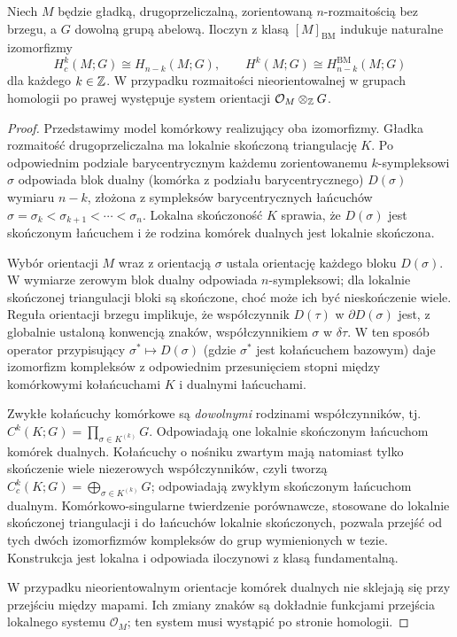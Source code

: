 \begin{twierdzenie}
\label{thm:noncompact-PD-v11}
Niech $M$ będzie gładką, drugoprzeliczalną,
zorientowaną $n$-rozmaitością bez brzegu,
a $G$ dowolną grupą abelową. Iloczyn z klasą
$[M]_{\mathrm{BM}}$ indukuje naturalne izomorfizmy
\[
H_c^k(M;G)\cong H_{n-k}(M;G),\qquad
H^k(M;G)\cong H_{n-k}^{\mathrm{BM}}(M;G)
\]
dla każdego $k\in\mathbb{Z}$. W przypadku rozmaitości
nieorientowalnej w grupach homologii po prawej
występuje system orientacji $\mathcal O_M\otimes_{\mathbb{Z}}G$.
\end{twierdzenie}
\begin{proof}
Przedstawimy model komórkowy realizujący oba izomorfizmy.
Gładka rozmaitość drugoprzeliczalna ma lokalnie skończoną
triangulację $K$. Po odpowiednim podziale barycentrycznym
każdemu zorientowanemu $k$-sympleksowi $\sigma$ odpowiada
blok dualny (komórka z podziału barycentrycznego) $D(\sigma)$ wymiaru $n-k$, złożona z
sympleksów barycentrycznych łańcuchów
$\sigma=\sigma_k<\sigma_{k+1}<\cdots<\sigma_n$.
Lokalna skończoność $K$ sprawia, że $D(\sigma)$ jest
skończonym łańcuchem i że rodzina komórek dualnych
jest lokalnie skończona.

Wybór orientacji $M$ wraz z orientacją $\sigma$
ustala orientację każdego bloku $D(\sigma)$.
W wymiarze zerowym blok dualny odpowiada
$n$-sympleksowi; dla lokalnie skończonej triangulacji
bloki są skończone, choć może ich być nieskończenie wiele.
Reguła orientacji brzegu implikuje,
że współczynnik $D(\tau)$ w $\partial D(\sigma)$
jest, z globalnie ustaloną konwencją znaków,
współczynnikiem $\sigma$ w $\delta\tau$.
W ten sposób operator przypisujący
$\sigma^*\mapsto D(\sigma)$ (gdzie $\sigma^*$ jest
kołańcuchem bazowym) daje izomorfizm kompleksów
z odpowiednim przesunięciem stopni między
komórkowymi kołańcuchami $K$ i dualnymi łańcuchami.

Zwykłe kołańcuchy komórkowe są \emph{dowolnymi}
rodzinami współczynników, tj.
$C^k(K;G)=\prod_{\sigma\in K^{(k)}}G$.
Odpowiadają one lokalnie skończonym łańcuchom
komórek dualnych. Kołańcuchy o nośniku zwartym
mają natomiast tylko skończenie wiele niezerowych
współczynników, czyli tworzą
$C_c^k(K;G)=\bigoplus_{\sigma\in K^{(k)}}G$;
odpowiadają zwykłym skończonym łańcuchom dualnym.
Komórkowo-singularne twierdzenie porównawcze,
stosowane do lokalnie skończonej triangulacji
i do łańcuchów lokalnie skończonych, pozwala
przejść od tych dwóch izomorfizmów kompleksów
do grup wymienionych w tezie. Konstrukcja jest
lokalna i odpowiada iloczynowi z klasą fundamentalną.

W przypadku nieorientowalnym orientacje komórek dualnych
nie sklejają się przy przejściu między mapami.
Ich zmiany znaków są dokładnie funkcjami przejścia
lokalnego systemu $\mathcal O_M$; ten system
musi wystąpić po stronie homologii.
\end{proof}

